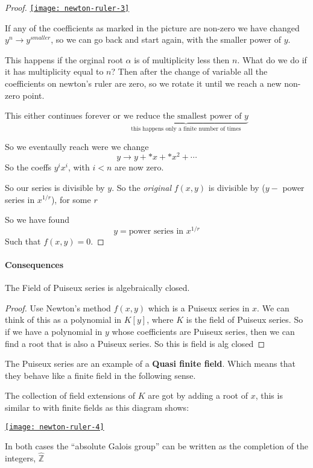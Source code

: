 \begin{theorem}
\begin{proof}
\href{https://youtu.be/paenRVq0vnc?t=725}{\texttt{[image: newton-ruler-3]}}

If any of the coefficients as marked in the picture are non-zero we have changed $y^n\rightarrow y^{smaller}$, so we can go back and start again, with the smaller power of $y$.

This happens if the orginal root $\alpha$ is of multiplicity less then $n$. What do we do if it has multiplicity equal to $n$? Then after the change of variable all the coefficients on newton's ruler are zero, so we rotate it until we reach a new non-zero point.

This either continues forever or $\underbrace{\text{we reduce the smallest power of }y}_{\text{this happens only a finite number of times}}$

So we eventaully reach were we change\[y\rightarrow y+\ast x+\ast x^2+\cdots\]
So the coeffs $y^i x^i$, with $i<n$ are now zero.

So our series is divisible by $y$. So the \textit{original} $f(x,y)$ is divisible by ($y-$ power series in $x^{1/r}$), for some $r$

So we have found \[y=\text{power series in }x^{1/r}\]
Such that $f(x,y) = 0$.
 
\end{proof}
\end{theorem}


\paragraph*{Consequences}
\begin{corollary}
    The Field of Puiseux series is algebraically closed.

    \begin{proof}
        Use Newton's method $f(x,y)$ which is a Puiseux series in $x$. We can think of this as a polynomial in $K[y]$, where $K$ is the field of Puiseux series. So if we have a polynomial in $y$ whose coefficients are Puiseux series, then we can find a root that is also a Puiseux series. So this is field is alg closed
    \end{proof}
\end{corollary}


\begin{definition}
    The Puiseux series are an example of a \textbf{Quasi finite field}. Which means that they behave like a finite field in the following sense. 

    The collection of field extensions of $K$ are got by adding a root of $x$, this is similar to with finite fields as this diagram shows:

    \href{https://youtu.be/paenRVq0vnc?t=1243}{\texttt{[image: newton-ruler-4]}}

    In both cases the ``absolute Galois group'' can be written as the completion of the integers, $\hat{\mathbb{Z}}$
\end{definition}

